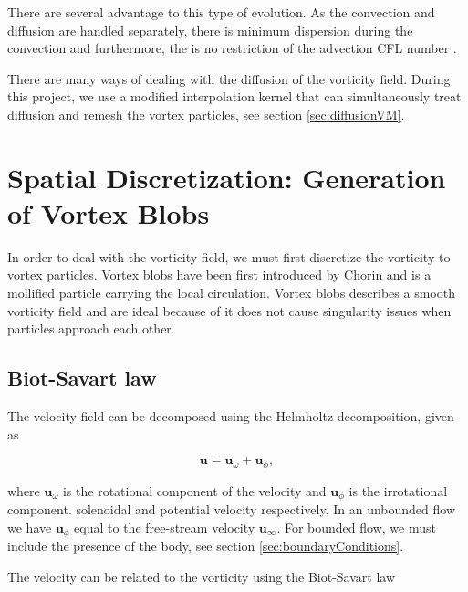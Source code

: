 There are several advantage to this type of evolution. As the convection and diffusion are handled separately, there is minimum dispersion during the convection and furthermore, the is no restriction of the advection CFL number \cite{Wee2006}.

There are many ways of dealing with the diffusion of the vorticity field. During this project, we use a modified interpolation kernel \cite{Wee2006} that can simultaneously treat diffusion and remesh the vortex particles, see section \ref{sec:diffusionVM}.

\section{Spatial Discretization: Generation of Vortex Blobs}


In order to deal with the vorticity field, we must first discretize the vorticity to vortex particles. Vortex blobs have been first introduced by Chorin and is a mollified particle carrying the local circulation. Vortex blobs describes a smooth vorticity field and are ideal because of it does not cause singularity issues when particles approach each other.

\subsection{Biot-Savart law}

The velocity field can be decomposed using the Helmholtz decomposition, given as

	\begin{equation}
	\mathbf{u} = \mathbf{u}_{\omega} + \mathbf{u}_{\phi},
	\end{equation}

where $\mathbf{u}_{\omega}$ is the rotational component of the velocity and $\mathbf{u}_{\phi}$ is the irrotational component. solenoidal and potential velocity respectively. In an unbounded flow we have $\mathbf{u}_{\phi}$ equal to the free-stream velocity $\mathbf{u}_{\infty}$. For bounded flow, we must include the presence of the body, see section \ref{sec:boundaryConditions}.
	
The velocity can be related to the vorticity using the Biot-Savart law

